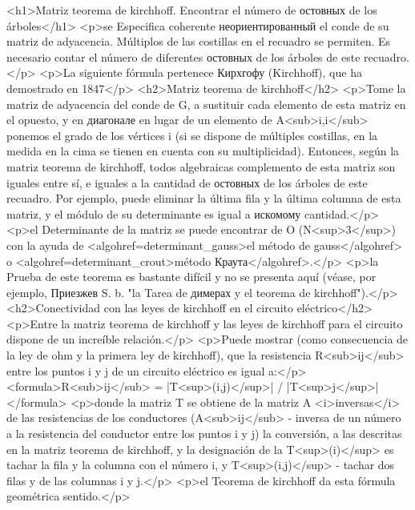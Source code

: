 <h1>Matriz teorema de kirchhoff. Encontrar el número de остовных de los árboles</h1>
<p>se Especifica coherente неориентированный el conde de su matriz de adyacencia. Múltiplos de las costillas en el recuadro se permiten. Es necesario contar el número de diferentes остовных de los árboles de este recuadro.</p>
<p>La siguiente fórmula pertenece Кирхгофу (Kirchhoff), que ha demostrado en 1847</p>
<h2>Matriz teorema de kirchhoff</h2>
<p>Tome la matriz de adyacencia del conde de G, a sustituir cada elemento de esta matriz en el opuesto, y en диагонале en lugar de un elemento de A<sub>i,i</sub> ponemos el grado de los vértices i (si se dispone de múltiples costillas, en la medida en la cima se tienen en cuenta con su multiplicidad). Entonces, según la matriz teorema de kirchhoff, todos algebraicas complemento de esta matriz son iguales entre sí, e iguales a la cantidad de остовных de los árboles de este recuadro. Por ejemplo, puede eliminar la última fila y la última columna de esta matriz, y el módulo de su determinante es igual a искомому cantidad.</p>
<p>el Determinante de la matriz se puede encontrar de O (N<sup>3</sup>) con la ayuda de <algohref=determinant_gauss>el método de gauss</algohref> o <algohref=determinant_crout>método Краута</algohref>.</p>
<p>la Prueba de este teorema es bastante difícil y no se presenta aquí (véase, por ejemplo, Приезжев S. b. "la Tarea de димерах y el teorema de kirchhoff").</p>
<h2>Conectividad con las leyes de kirchhoff en el circuito eléctrico</h2>
<p>Entre la matriz teorema de kirchhoff y las leyes de kirchhoff para el circuito dispone de un increíble relación.</p>
<p>Puede mostrar (como consecuencia de la ley de ohm y la primera ley de kirchhoff), que la resistencia R<sub>ij</sub> entre los puntos i y j de un circuito eléctrico es igual a:</p>
<formula>R<sub>ij</sub> = |T<sup>(i,j)</sup>| / |T<sup>j</sup>|</formula>
<p>donde la matriz T se obtiene de la matriz A <i>inversas</i> de las resistencias de los conductores (A<sub>ij</sub> - inversa de un número a la resistencia del conductor entre los puntos i y j) la conversión, a las descritas en la matriz teorema de kirchhoff, y la designación de la T<sup>(i)</sup> es tachar la fila y la columna con el número i, y T<sup>(i,j)</sup> - tachar dos filas y de las columnas i y j.</p>
<p>el Teorema de kirchhoff da esta fórmula geométrica sentido.</p>